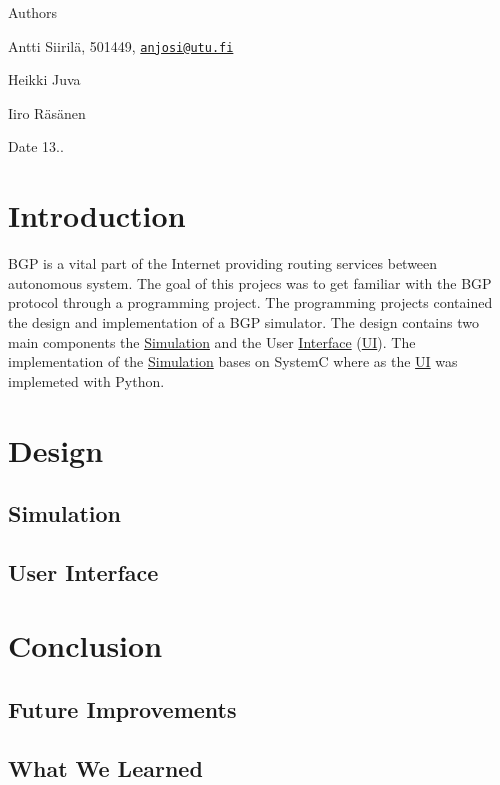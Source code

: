 \begin{DoxyAuthor}{Authors}
\begin{DoxyItemize}
\item Antti Siirilä, 501449, \href{mailto:anjosi@utu.fi}{\tt anjosi@utu.\-fi}\item Heikki Juva\item Iiro Räsänen \end{DoxyItemize}

\end{DoxyAuthor}
\begin{DoxyDate}{Date}
13.. 
\end{DoxyDate}
\hypertarget{index_s_intro}{}\section{Introduction}\label{index_s_intro}
B\-G\-P is a vital part of the Internet providing routing services between autonomous system. The goal of this projecs was to get familiar with the B\-G\-P protocol through a programming project. The programming projects contained the design and implementation of a B\-G\-P simulator. The design contains two main components the \hyperlink{classSimulation}{Simulation} and the User \hyperlink{classInterface}{Interface} (\hyperlink{namespaceUI}{U\-I}). The implementation of the \hyperlink{classSimulation}{Simulation} bases on System\-C where as the \hyperlink{namespaceUI}{U\-I} was implemeted with Python. \hypertarget{index_s_design}{}\section{Design}\label{index_s_design}
\hypertarget{index_sub_Simulation}{}\subsection{Simulation}\label{index_sub_Simulation}
\hypertarget{index_sub_UI}{}\subsection{User Interface}\label{index_sub_UI}
\hypertarget{index_s_conclusion}{}\section{Conclusion}\label{index_s_conclusion}
\hypertarget{index_sub_futureImprovements}{}\subsection{Future Improvements}\label{index_sub_futureImprovements}
\hypertarget{index_sub_whatwelearned}{}\subsection{What We Learned}\label{index_sub_whatwelearned}
